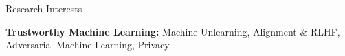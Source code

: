 \begin{rSection}{Research Interests}

\small{\textbf{Trustworthy Machine Learning:} Machine Unlearning, Alignment \& RLHF, Adversarial Machine Learning, Privacy }

\end{rSection}